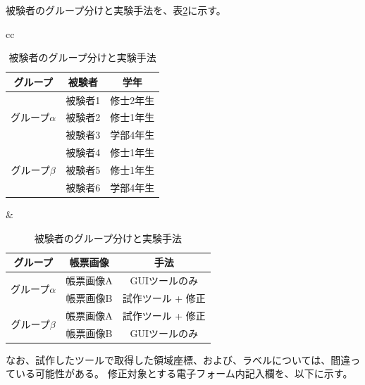 被験者のグループ分けと実験手法を、表\ref{tb:experiment_case}に示す。

\begin{table}[tp]
	\centering
	\caption{被験者のグループ分けと実験手法}
    \label{tb:experiment_case}
    \begin{tabular}{cc}
        \begin{minipage}[c]{0.45\hsize}
            \centering
            \begin{tabular}{c|c|c}
                グループ & 被験者 & 学年\\
                \hline \hline
                \multirow{3}{*}{グループ$\alpha$} & 被験者1 & 修士2年生\\
                                               & 被験者2 & 修士1年生\\
                                               & 被験者3 & 学部4年生\\
                                        \hline
                \multirow{3}{*}{グループ$\beta$} & 被験者4 & 修士1年生\\
                                              & 被験者5 & 修士1年生\\
                                              & 被験者6 & 学部4年生
	        \end{tabular}
        \end{minipage} &
        \begin{minipage}[c]{0.45\hsize}
            \centering
            \begin{tabular}{c|c|c}
                グループ & 帳票画像 & 手法 \\
                \hline \hline
                \multirow{2}{*}{グループ$\alpha$} & 帳票画像A & GUIツールのみ \\
                                               & 帳票画像B & 試作ツール + 修正 \\
                                        \hline
                \multirow{2}{*}{グループ$\beta$} & 帳票画像A & 試作ツール + 修正 \\
                                              & 帳票画像B & GUIツールのみ
            \end{tabular}
        \end{minipage}
    \end{tabular}
\end{table}

なお、試作したツールで取得した領域座標、および、ラベルについては、間違っている可能性がある。
修正対象とする電子フォーム内記入欄を、以下に示す。

